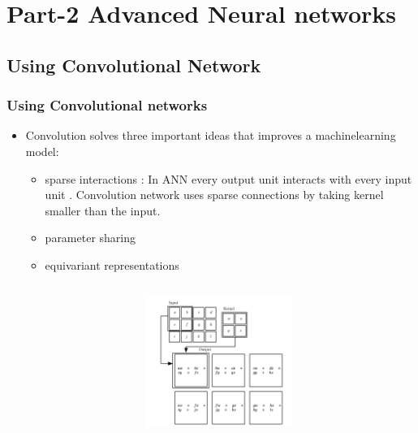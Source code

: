 \documentclass[12pt,t]{beamer}
\begin{document}
\section{Part-2 Advanced Neural networks}

\subsection{Using Convolutional Network}
\begin{frame}
    \frametitle{Using Convolutional networks}

    \scriptsize

    \begin{itemize}
        \item Convolution solves  three important ideas that  improves a machinelearning model:
        \begin{itemize}
            \scriptsize
            \item sparse interactions : In ANN every output unit interacts with every input unit . Convolution network
                    uses sparse connections by taking kernel smaller than the input.
            \item parameter sharing 
            \item equivariant representations
        \end{itemize}
    \end{itemize}

    \begin{columns}
        \begin{column}[T]{0.5\linewidth}
        \end{column}
        \begin{column}[T]{0.5\linewidth}
            \includegraphics[width=\linewidth,height=120pt]{convolution_network/kernel_operation.png}
        \end{column}

 
    \end{columns}
    

\end{frame}
\end{document}
